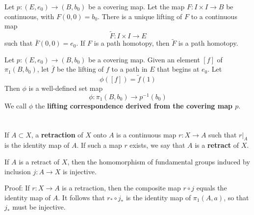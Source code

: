 \documentclass[12pt, a4paper, oneside]{book}
\begin{document}
\begin{theorem}
    Let $p: \left(E,e_0\right) \rightarrow \left(B,b_0\right)$ be a covering map.
    Let the map $F: I \times I \rightarrow B$ be continuous, with $F(0,0)=b_0$. There is a unique lifting of $F$ to a continuous map
    \begin{equation*}
        \tilde{F}: I \times I \rightarrow E
    \end{equation*}
    such that $\bar{F}(0,0)=e_0$. If $F$ is a path homotopy, then $\tilde{F}$ is a path homotopy.
\end{theorem}

\newpage

\begin{definition}
    Let $p: \left(E,e_0\right) \rightarrow \left(B,b_0\right)$ be a covering map.
    Given an element $[f]$ of $\pi_1\left(B, b_0\right)$, let
    $\bar{f}$ be the lifting of $f$ to a path in $E$ that begins at $e_0$. Let
    \begin{equation*}
        \phi([f]) =\tilde{f}(1)
    \end{equation*}
    Then $\phi$ is a well-defined set map
    \begin{equation*}
        \phi: \pi_1\left(B, b_0\right) \rightarrow p^{-1}\left(b_0\right)
    \end{equation*}
    We call $\phi$ the \textbf{lifting correspondence derived from the covering map $p$}.
\end{definition}





\section{}

\begin{definition}
    If $A \subset X$, a \textbf{retraction} of $X$ onto $A$ is a continuous map $r: X \rightarrow A$ such that $\left.r\right|_A$ is the identity map of $A$. If such a map $r$ exists, we say that $A$ is a \textbf{retract} of $X$.
\end{definition}

\begin{proposition}
    If $A$ is a retract of $X$, then the homomorphism of fundamental groups induced by inclusion $j: A \rightarrow X$ is injective.

    Proof:
    If $r: X \rightarrow A$ is a retraction, then the composite map $r \circ j$ equals the identity map of $A$. It follows that $r_* \circ j_*$ is the identity map of $\pi_1(A, a)$, so that $j_*$ must be injective.
\end{proposition}
\end{document}
